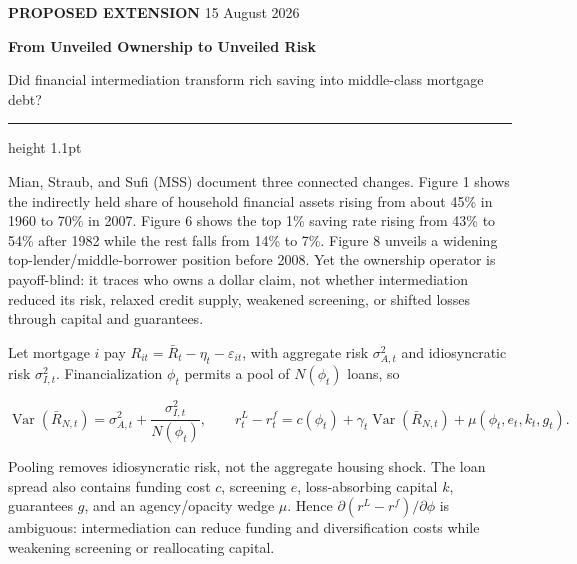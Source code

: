 {\color{MSSOrange}\bfseries\small PROPOSED EXTENSION}\hfill
{\color{MSSGray}\small 15 August 2026}\par
{\color{MSSNavy}\bfseries\LARGE From Unveiled Ownership to Unveiled Risk}\par
{\color{MSSGray}\small Did financial intermediation transform rich saving into middle-class mortgage debt?}
\vspace{0.24em}\hrule height 1.1pt\vspace{0.32em}


Mian, Straub, and Sufi (MSS) document three connected changes. Figure 1 shows
the indirectly held share of household financial assets rising from about 45\%
in 1960 to 70\% in 2007. Figure 6 shows the top 1\% saving rate rising from 43\%
to 54\% after 1982 while the rest falls from 14\% to 7\%. Figure 8 unveils a
widening top-lender/middle-borrower position before 2008. Yet the ownership
operator is payoff-blind: it traces who owns a dollar claim, not whether
intermediation reduced its risk, relaxed credit supply, weakened screening, or
shifted losses through capital and guarantees.

\noindent{}


Let mortgage $i$ pay $R_{it}=\bar R_t-\eta_t-\varepsilon_{it}$, with aggregate
risk $\sigma^2_{A,t}$ and idiosyncratic risk $\sigma^2_{I,t}$. Financialization
$\phi_t$ permits a pool of $N(\phi_t)$ loans, so

\begin{equation*}
 \operatorname{Var}(\bar R_{N,t})
 =\sigma^2_{A,t}+\frac{\sigma^2_{I,t}}{N(\phi_t)},
 \qquad
 r^L_t-r^f_t
 =c(\phi_t)+\gamma_t\operatorname{Var}(\bar R_{N,t})
  +\mu(\phi_t,e_t,k_t,g_t).
\end{equation*}

Pooling removes idiosyncratic risk, not the aggregate housing shock. The loan
spread also contains funding cost $c$, screening $e$, loss-absorbing capital
$k$, guarantees $g$, and an agency/opacity wedge $\mu$. Hence
$\partial(r^L-r^f)/\partial\phi$ is ambiguous: intermediation can reduce funding
and diversification costs while weakening screening or reallocating capital.

